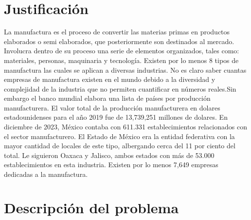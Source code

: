    \section{Justificación}
    
        La manufactura es el proceso de convertir las materias primas en productos elaborados o semi elaborados, que posteriormente son destinados al mercado. Involucra dentro de su proceso una serie de elementos organizados, tales como: materiales, personas, maquinaria y tecnología. Existen por lo menos 8 tipos de manufactura las cuales se aplican a diversas industrias. \cite{Definicionmanufactura}
        No es claro saber cuantas empresas de manufactura existen en el mundo debido a la diversidad y complejidad de la industria que no permiten cuantificar en números reales.Sin embargo el banco mundial elabora una lista de países por producción manufacturera. 
        El valor total de la producción manufacturera en dolares estadounidenses para el año 2019 fue de 13,739,251 millones de dolares.
        En diciembre de 2023, México contaba con 611.331 establecimientos relacionados con el sector manufacturero. El Estado de México era la entidad federativa con la mayor cantidad de locales de este tipo, albergando cerca del 11 por ciento del total. Le siguieron Oaxaca y Jalisco, ambos estados con más de 53.000 establecimientos en esta industria.\cite{ManufacturaMéxico}
    Existen por lo menos 7,649 empresas dedicadas a la manufactura. 
    \section{Descripción del problema}
    
